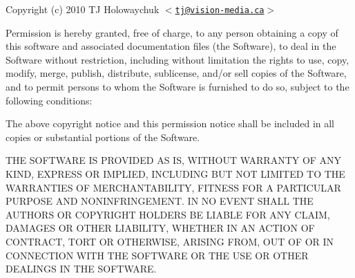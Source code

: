 Copyright (c) 2010 TJ Holowaychuk $<$\href{mailto:tj@vision-media.ca}{\tt tj@vision-\/media.\+ca}$>$

Permission is hereby granted, free of charge, to any person obtaining a copy of this software and associated documentation files (the \textquotesingle{}Software\textquotesingle{}), to deal in the Software without restriction, including without limitation the rights to use, copy, modify, merge, publish, distribute, sublicense, and/or sell copies of the Software, and to permit persons to whom the Software is furnished to do so, subject to the following conditions\+:

The above copyright notice and this permission notice shall be included in all copies or substantial portions of the Software.

T\+HE S\+O\+F\+T\+W\+A\+RE IS P\+R\+O\+V\+I\+D\+ED \textquotesingle{}AS IS\textquotesingle{}, W\+I\+T\+H\+O\+UT W\+A\+R\+R\+A\+N\+TY OF A\+NY K\+I\+ND, E\+X\+P\+R\+E\+SS OR I\+M\+P\+L\+I\+ED, I\+N\+C\+L\+U\+D\+I\+NG B\+UT N\+OT L\+I\+M\+I\+T\+ED TO T\+HE W\+A\+R\+R\+A\+N\+T\+I\+ES OF M\+E\+R\+C\+H\+A\+N\+T\+A\+B\+I\+L\+I\+TY, F\+I\+T\+N\+E\+SS F\+OR A P\+A\+R\+T\+I\+C\+U\+L\+AR P\+U\+R\+P\+O\+SE A\+ND N\+O\+N\+I\+N\+F\+R\+I\+N\+G\+E\+M\+E\+NT. IN NO E\+V\+E\+NT S\+H\+A\+LL T\+HE A\+U\+T\+H\+O\+RS OR C\+O\+P\+Y\+R\+I\+G\+HT H\+O\+L\+D\+E\+RS BE L\+I\+A\+B\+LE F\+OR A\+NY C\+L\+A\+IM, D\+A\+M\+A\+G\+ES OR O\+T\+H\+ER L\+I\+A\+B\+I\+L\+I\+TY, W\+H\+E\+T\+H\+ER IN AN A\+C\+T\+I\+ON OF C\+O\+N\+T\+R\+A\+CT, T\+O\+RT OR O\+T\+H\+E\+R\+W\+I\+SE, A\+R\+I\+S\+I\+NG F\+R\+OM, O\+UT OF OR IN C\+O\+N\+N\+E\+C\+T\+I\+ON W\+I\+TH T\+HE S\+O\+F\+T\+W\+A\+RE OR T\+HE U\+SE OR O\+T\+H\+ER D\+E\+A\+L\+I\+N\+GS IN T\+HE S\+O\+F\+T\+W\+A\+RE. 